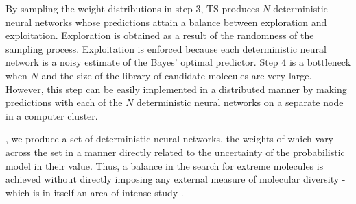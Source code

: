 By sampling the weight distributions in step 3, TS produces $N$ deterministic neural networks whose predictions attain a balance between exploration and exploitation. Exploration is obtained as a result of the randomness of the sampling process. Exploitation is enforced because each deterministic neural network is a noisy estimate of the Bayes' optimal predictor. 
Step 4 is a bottleneck when $N$ and the size of the library of candidate molecules are very large. However, this step can 
be easily implemented in a distributed manner by making predictions with each of the $N$ deterministic neural networks on a separate node in a computer cluster.


, we produce a set of deterministic neural networks, the weights of which vary across the set in a manner directly related to the uncertainty of the probabilistic model in their value.  Thus, a balance in the search for extreme molecules is achieved without directly imposing any external measure of molecular diversity - which is in itself an area of intense study \cite{Maldonado_2006}.
